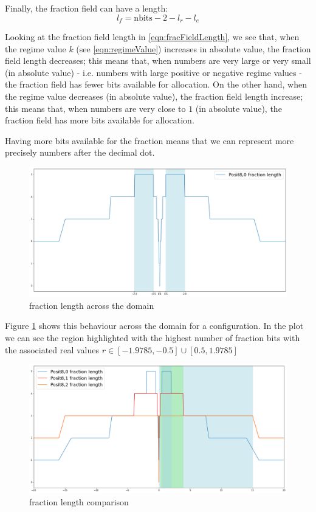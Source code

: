 Finally, the fraction field can have a length:
\begin{equation}\label{eqn:fracFieldLength}
l_f = \text{nbits} - 2 - l_r - l_e
\end{equation}

Looking at the fraction field length in \eqref{eqn:fracFieldLength}, we see that, when the regime value $k$ (see \eqref{eqn:regimeValue}) increases in absolute value, the fraction field length decreases; this means that, when numbers are very large or very small (in absolute value) - i.e. numbers with large positive or negative regime values - the fraction field has fewer bits available for allocation. On the other hand, when the regime value decreases (in absolute value), the fraction field length increase; this means that, when numbers are very close to $1$ (in absolute value), the fraction field has more bits available for allocation. 

Having more bits available for the fraction means that we can represent more precisely numbers after the decimal dot.

\begin{figure}
    \centering
    \includegraphics[width=\linewidth]{img/posit80fractionsWithZoom.png}
    \caption{ fraction length across the domain}
    \label{fig:posit80Fractions}
\end{figure}

Figure \ref{fig:posit80Fractions} shows this behaviour across the domain for a  configuration. In the plot we can see the region highlighted with the highest number of fraction bits with the associated real values $r \in [-1.9785,-0.5] \cup [0.5,1.9785]$


\begin{figure}
    \centering
    \includegraphics[width=\linewidth]{img/posit8xFractions.png}
    \caption{ fraction length comparison}
    \label{fig:posit8xFractions}
\end{figure}

